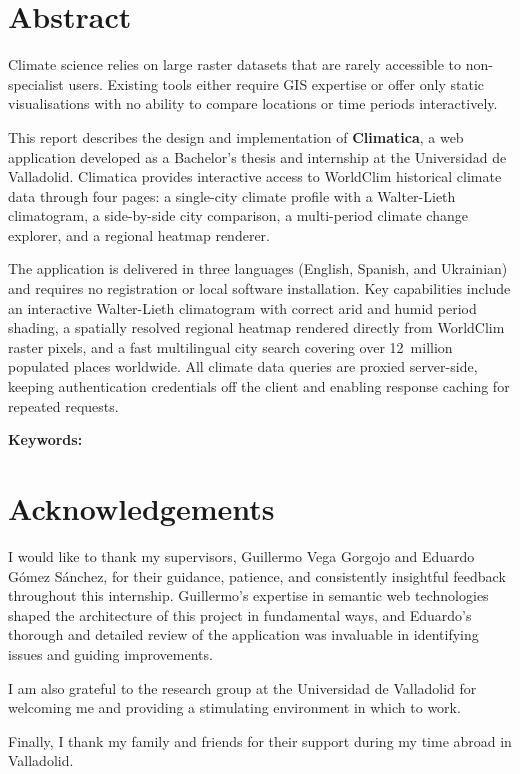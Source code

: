 \chapter*{Abstract}

Climate science relies on large raster datasets that are rarely accessible to
non-specialist users. Existing tools either require GIS expertise or offer only
static visualisations with no ability to compare locations or time periods
interactively.

This report describes the design and implementation of \textbf{Climatica}, a 
web application developed as a Bachelor's thesis and internship at the 
Universidad de Valladolid. Climatica provides interactive access to WorldClim historical
climate data through four pages: a single-city climate profile with a
Walter-Lieth climatogram, a side-by-side city comparison, a multi-period
climate change explorer, and a regional heatmap renderer.

The application is delivered in three languages (English, Spanish, and
Ukrainian) and requires no registration or local software installation.
Key capabilities include an interactive Walter-Lieth climatogram with
correct arid and humid period shading, a spatially resolved regional
heatmap rendered directly from WorldClim raster pixels, and a fast
multilingual city search covering over 12~million populated places
worldwide. All climate data queries are proxied server-side, keeping
authentication credentials off the client and enabling response caching
for repeated requests.

\vspace{0.5cm}
\noindent\textbf{Keywords:} \palabrasClave

\chapter*{Acknowledgements}

I would like to thank my supervisors, Guillermo Vega Gorgojo and Eduardo
Gómez Sánchez, for their guidance, patience, and consistently insightful
feedback throughout this internship. Guillermo's expertise in semantic web
technologies shaped the architecture of this project in fundamental ways,
and Eduardo's thorough and detailed review of the application was invaluable
in identifying issues and guiding improvements.


I am also grateful to the research group at the Universidad de Valladolid for
welcoming me and providing a stimulating environment in which to work.

Finally, I thank my family and friends for their support during my time abroad
in Valladolid.

\tableofcontents
\listoffigures
\listoftables